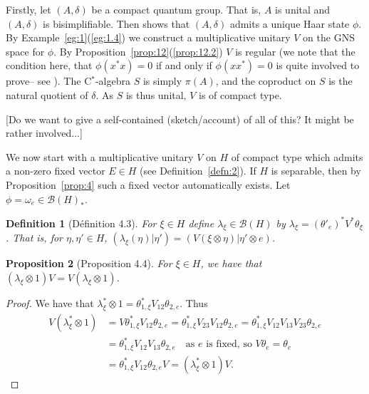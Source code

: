 \documentclass[a4paper,12pt]{article}
\theoremstyle{plain}
\newtheorem{proposition}{Proposition}[section]
\newtheorem{definition}[proposition]{Definition}
\theoremstyle{definition}
\newcommand{\mc}{\mathcal}
\begin{document}
Firstly, let $(A,\delta)$ be a compact quantum group.  That is, $A$ is unital
and $(A,\delta)$ is bisimplifiable.  Then \cite{woro} shows that $(A,\delta)$
admits a unique Haar state $\phi$.  By Example~\ref{eg:1}(\ref{eg:1.4}) we
construct a multiplicative unitary $V$ on the GNS space for $\phi$.
By Proposition~\ref{prop:12}(\ref{prop:12.2}) $V$ is regular (we note that
the condition here, that $\phi(x^*x)=0$ if and only if $\phi(xx^*)=0$ is
quite involved to prove-- see \cite[???]{woro}).  The C$^*$-algebra $S$
is simply $\pi(A)$, and the coproduct on $S$ is the natural quotient of
$\delta$.  As $S$ is thus unital, $V$ is of compact type.

[Do we want to give a self-contained (sketch/account) of all of this?  It
might be rather involved...]

We now start with a multiplicative unitary $V$ on $H$ of compact type which
admits a non-zero fixed vector $E\in H$ (see Definition~\ref{defn:2}).
If $H$ is separable, then by Proposition~\ref{prop:4} such a fixed vector 
automatically exists.  Let $\phi = \omega_e\in\mc B(H)_*$.

\begin{definition}[D\'efinition 4.3]\label{defn:3}
For $\xi\in H$ define $\lambda_\xi\in\mc B(H)$ by $\lambda_\xi
= (\theta'_e)^* V^* \theta_\xi$.  That is, for $\eta,\eta'\in H$,
$(\lambda_\xi(\eta)|\eta') = (V(\xi\otimes\eta)|\eta'\otimes e)$.
\end{definition}

\begin{proposition}[Proposition 4.4]\label{prop:13}
For $\xi\in H$, we have that $(\lambda_\xi\otimes 1)V =
V(\lambda_\xi\otimes 1)$.
\end{proposition}
\begin{proof}
We have that $\lambda_\xi^*\otimes 1 = \theta^*_{1,\xi} V_{12} \theta_{2,e}$.
Thus
\begin{align*} V(\lambda_\xi^*\otimes 1) &=
V \theta^*_{1,\xi} V_{12} \theta_{2,e}
= \theta^*_{1,\xi} V_{23} V_{12} \theta_{2,e}
= \theta^*_{1,\xi} V_{12} V_{13} V_{23} \theta_{2,e} \\
&= \theta^*_{1,\xi} V_{12} V_{13} \theta_{2,e}
\quad\text{as $e$ is fixed, so $V\theta_e = \theta_e$} \\
&= \theta^*_{1,\xi} V_{12} \theta_{2,e} V
= (\lambda_\xi^*\otimes 1)V.
\end{align*}
\end{proof}
\end{document}
